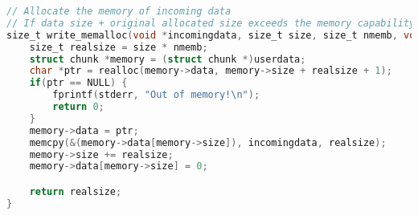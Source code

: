 \begin{lstlisting}[label={appdx:A-write-memalloc}, language=C, caption=\texttt{write\textunderscore memalloc()}]
// Allocate the memory of incoming data
// If data size + original allocated size exceeds the memory capability, print an error.
size_t write_memalloc(void *incomingdata, size_t size, size_t nmemb, void *userdata) {
    size_t realsize = size * nmemb;
    struct chunk *memory = (struct chunk *)userdata;
    char *ptr = realloc(memory->data, memory->size + realsize + 1);
    if(ptr == NULL) {
        fprintf(stderr, "Out of memory!\n");
        return 0;
    } 
    memory->data = ptr;
    memcpy(&(memory->data[memory->size]), incomingdata, realsize);
    memory->size += realsize;
    memory->data[memory->size] = 0;

    return realsize;
}
\end{lstlisting}

